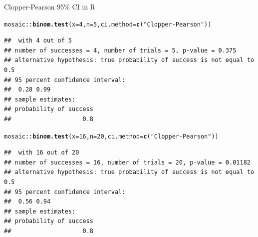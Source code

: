 \documentclass[10pt]{beamer}\usepackage[]{graphicx}\usepackage[]{color}
\makeatletter
\newcommand{\hlnum}[1]{\textcolor[rgb]{0.686,0.059,0.569}{#1}}%
\newcommand{\hlstr}[1]{\textcolor[rgb]{0.192,0.494,0.8}{#1}}%
\newcommand{\hlopt}[1]{\textcolor[rgb]{0,0,0}{#1}}%
\newcommand{\hlstd}[1]{\textcolor[rgb]{0.345,0.345,0.345}{#1}}%
\newcommand{\hlkwc}[1]{\textcolor[rgb]{0.333,0.667,0.333}{#1}}%
\newcommand{\hlkwd}[1]{\textcolor[rgb]{0.737,0.353,0.396}{\textbf{#1}}}%
\newenvironment{kframe}{%
 \def\at@end@of@kframe{}%
 \ifinner\ifhmode%
  \def\at@end@of@kframe{\end{minipage}}%
  \begin{minipage}{\columnwidth}%
 \fi\fi%
 \def\FrameCommand##1{\hskip\@totalleftmargin \hskip-\fboxsep
 \colorbox{shadecolor}{##1}\hskip-\fboxsep
     \hskip-\linewidth \hskip-\@totalleftmargin \hskip\columnwidth}%
 \MakeFramed {\advance\hsize-\width
   \@totalleftmargin\z@ \linewidth\hsize
   \@setminipage}}%
 {\par\unskip\endMakeFramed%
 \at@end@of@kframe}
\newenvironment{knitrout}{}{} %
\makeatother
\begin{document}
\begin{frame}[fragile]{Clopper-Pearson 95\% CI in R}
\begin{knitrout}\tiny
{}\color{fgcolor}\begin{kframe}
\begin{alltt}
\hlstd{mosaic}\hlopt{::}\hlkwd{binom.test}\hlstd{(}\hlkwc{x}\hlstd{=}\hlnum{4}\hlstd{,} \hlkwc{n}\hlstd{=}\hlnum{5}\hlstd{,} \hlkwc{ci.method}\hlstd{=}\hlkwd{c}\hlstd{(}\hlstr{"Clopper-Pearson"}\hlstd{))}
\end{alltt}
\begin{verbatim}
##  with 4 out of 5 
## number of successes = 4, number of trials = 5, p-value = 0.375
## alternative hypothesis: true probability of success is not equal to 0.5 
## 95 percent confidence interval:
##  0.28 0.99 
## sample estimates:
## probability of success 
##                    0.8
\end{verbatim}
\begin{alltt}
\hlstd{mosaic}\hlopt{::}\hlkwd{binom.test}\hlstd{(}\hlkwc{x}\hlstd{=}\hlnum{16}\hlstd{,} \hlkwc{n}\hlstd{=}\hlnum{20}\hlstd{,} \hlkwc{ci.method}\hlstd{=}\hlkwd{c}\hlstd{(}\hlstr{"Clopper-Pearson"}\hlstd{))}
\end{alltt}
\begin{verbatim}
##  with 16 out of 20 
## number of successes = 16, number of trials = 20, p-value = 0.01182
## alternative hypothesis: true probability of success is not equal to 0.5 
## 95 percent confidence interval:
##  0.56 0.94 
## sample estimates:
## probability of success 
##                    0.8
\end{verbatim}
\end{kframe}
\end{knitrout}
\end{frame}
\end{document}
